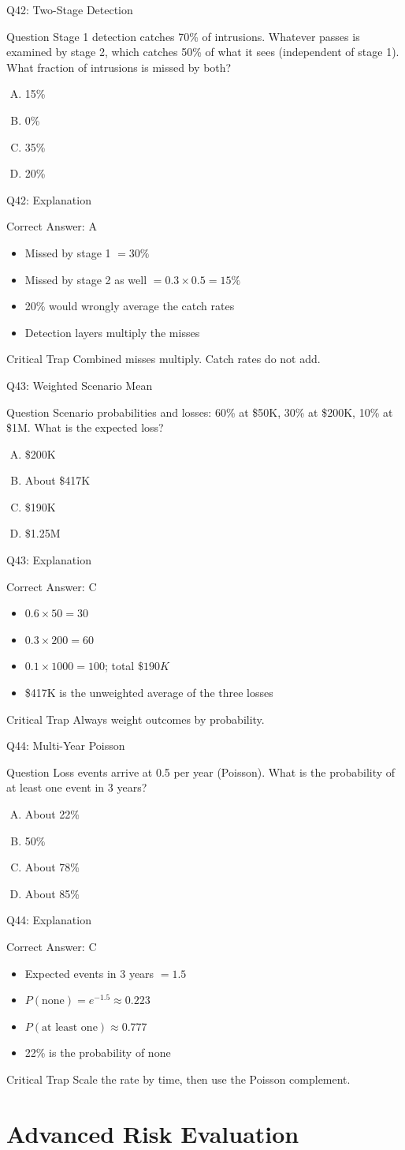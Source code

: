 \documentclass[aspectratio=169]{beamer}
\newcommand{\hq}[7]{%
  \begin{frame}{Q#1: #2}
    \begin{block}{Question}
      #3
    \end{block}
    \begin{enumerate}[(A)]
      #4
    \end{enumerate}
  \end{frame}
  \begin{frame}{Q#1: Explanation}
    \begin{block}{Correct Answer: #5}
      \begin{itemize}
        #6
      \end{itemize}
    \end{block}
    \begin{alertblock}{Critical Trap}
      #7
    \end{alertblock}
  \end{frame}
}
\begin{document}
\hq{42}{Two-Stage Detection}
{Stage 1 detection catches 70\% of intrusions. Whatever passes is examined by stage 2, which catches 50\% of what it sees (independent of stage 1). What fraction of intrusions is missed by both?}
{\item 15\%
 \item 0\%
 \item 35\%
 \item 20\%}
{A}
{\item Missed by stage 1 $= 30\%$
 \item Missed by stage 2 as well $= 0.3 \times 0.5 = 15\%$
 \item 20\% would wrongly average the catch rates
 \item Detection layers multiply the misses}
{Combined misses multiply. Catch rates do not add.}

\hq{43}{Weighted Scenario Mean}
{Scenario probabilities and losses: 60\% at \$50K, 30\% at \$200K, 10\% at \$1M. What is the expected loss?}
{\item \$200K
 \item About \$417K
 \item \$190K
 \item \$1.25M}
{C}
{\item $0.6 \times 50 = 30$
 \item $0.3 \times 200 = 60$
 \item $0.1 \times 1000 = 100$; total $\$190K$
 \item \$417K is the unweighted average of the three losses}
{Always weight outcomes by probability.}

\hq{44}{Multi-Year Poisson}
{Loss events arrive at 0.5 per year (Poisson). What is the probability of at least one event in 3 years?}
{\item About 22\%
 \item 50\%
 \item About 78\%
 \item About 85\%}
{C}
{\item Expected events in 3 years $= 1.5$
 \item $P(\text{none}) = e^{-1.5} \approx 0.223$
 \item $P(\text{at least one}) \approx 0.777$
 \item 22\% is the probability of none}
{Scale the rate by time, then use the Poisson complement.}

\section{Advanced Risk Evaluation}
\end{document}
